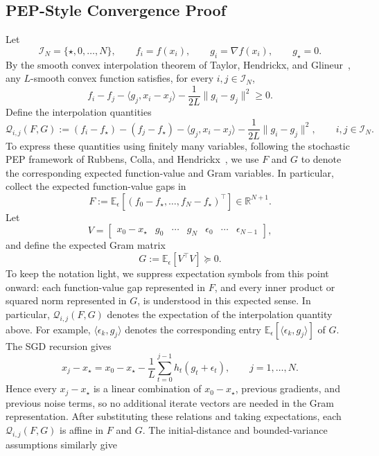 \documentclass[11pt, hidelinks]{article}
\begin{document}
\subsection{PEP-Style Convergence Proof}\label{subsec:PEP-style}
Let
\[ \mathcal I_N=\{\star,0,\ldots,N\}, \qquad f_i=f(x_i), \qquad g_i=\nabla f(x_i), \qquad g_\star=0. \]
By the smooth convex interpolation theorem of
Taylor, Hendrickx, and Glineur~\cite{taylor2017smooth}, any
$L$-smooth convex function satisfies, for every $i,j\in\mathcal I_N$,
\[ f_i-f_j -\langle g_j,x_i-x_j\rangle -\frac{1}{2L}\|g_i-g_j\|^2 \geq 0. \]
Define the interpolation quantities
\[\mathcal Q_{i,j}(F,G):=(f_i-f_\star)-(f_j-f_\star)-\langle g_j,x_i-x_j\rangle-\frac{1}{2L}\|g_i-g_j\|^2,\qquad i,j\in\mathcal I_N.\]
To express these quantities using finitely many variables, following the
stochastic PEP framework of Rubbens, Colla, and
Hendrickx~\cite{rubbens2025}, we use $F$ and $G$ to denote the
corresponding expected function-value and Gram variables. In particular,
collect the expected function-value gaps in
\[F:=\mathbb E_\epsilon
\left[(f_0-f_\star,\ldots,f_N-f_\star)^\top\right]
\in\mathbb R^{N+1}.\]
Let
\[V=
\begin{bmatrix}
x_0-x_\star
&
g_0
&
\cdots
&
g_N
&
\epsilon_0
&
\cdots
&
\epsilon_{N-1}
\end{bmatrix},\]
and define the expected Gram matrix
\[G:=\mathbb E_\epsilon[V^\top V]\succeq0.\]
To keep the notation light, we suppress expectation symbols from this
point onward: each function-value gap represented in $F$, and every
inner product or squared norm represented in $G$, is understood in this
expected sense. In particular, $\mathcal Q_{i,j}(F,G)$ denotes the
expectation of the interpolation quantity above. For example,
$\langle\epsilon_k,g_j\rangle$ denotes the corresponding entry
$\mathbb E_\epsilon[\langle\epsilon_k,g_j\rangle]$ of $G$.
The SGD recursion gives \[x_j-x_\star=x_0-x_\star-\frac1L\sum_{t=0}^{j-1}
h_t(g_t+\epsilon_t),\qquad j=1,\ldots,N. \]
Hence every $x_j-x_\star$ is a linear combination of
$x_0-x_\star$, previous gradients, and previous noise terms, so no
additional iterate vectors are needed in the Gram representation.
After substituting these relations and taking expectations, each
$\mathcal Q_{i,j}(F,G)$ is affine in $F$ and $G$.
The initial-distance and bounded-variance assumptions similarly give
\end{document}
